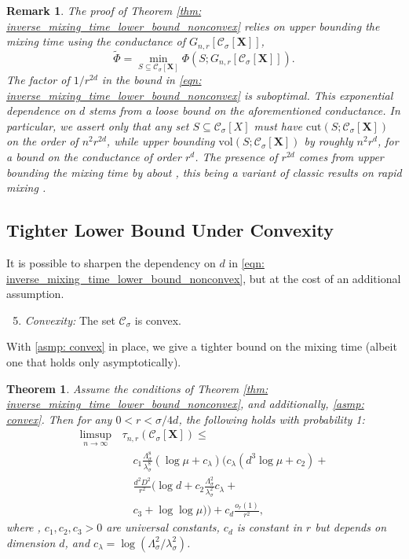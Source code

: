 \documentclass{article}
\newcommand{\vol}{\mathrm{vol}}
\newcommand{\cut}{\mathrm{cut}}
\newcommand{\1}{\mathbf{1}}
\newcommand{\Xbf}{\mathbf{X}}
\newcommand{\Cset}{\mathcal{C}}
\newcommand{\Csig}{\Cset_{\sigma}}
\theoremstyle{aldenthm}
\newtheorem{theorem}{Theorem}
\theoremstyle{aldenrmrk}
\newtheorem{remark}{Remark}
\begin{document}
\begin{remark}
The proof of Theorem \ref{thm: inverse_mixing_time_lower_bound_nonconvex} relies
on upper bounding the mixing time using the \emph{conductance} of $G_{n,r}[\Csig[\Xbf]]$, 
$$
\widetilde{\Phi} = \min_{S \subseteq \Csig[\Xbf]} \Phi(S; G_{n,r}[\Csig[\Xbf]]).
$$
The factor of $1/r^{2d}$ in the bound in \eqref{eqn:
  inverse_mixing_time_lower_bound_nonconvex} is suboptimal. This exponential 
dependence on $d$ stems from a loose bound on the aforementioned
conductance. In particular, we assert only that any set $S \subseteq \Csig[X]$
must have $\cut(S; \Csig[\Xbf])$ on the order of $n^2 r^{2d}$, while upper bounding
$\vol(S; \Csig[\Xbf])$ by roughly $n^2 r^d$, for a bound on the conductance of
order $r^d$. The presence of $r^{2d}$ comes from upper bounding the mixing time
by about , this being a variant of classic results
on rapid mixing \citep{jerrum89}.  
\end{remark}

\subsection{Tighter Lower Bound Under Convexity}

It is possible to sharpen the dependency on $d$ in 
\eqref{eqn: inverse_mixing_time_lower_bound_nonconvex}, but at the cost of an  
additional assumption.
\begin{enumerate}[label=(A\arabic*)]
\setcounter{enumi}{4}
\item 
\label{asmp: convex}
\emph{Convexity:} The set $\Cset_\sigma$ is convex. 
\end{enumerate}

With \ref{asmp: convex} in place, we give a tighter bound on the
mixing time (albeit one that holds only asymptotically).   

\begin{theorem}
\label{thm: inverse_mixing_time_lower_bound}
Assume the conditions of Theorem \ref{thm:
  inverse_mixing_time_lower_bound_nonconvex}, and additionally, \ref{asmp:
  convex}. Then for any $0 < r < \sigma/4d$, the following holds with
probability 1:   
\begin{align}
\label{eqn: inverse_mixing_time_lower_bound}
  \limsup_{n \to \infty} \, &\tau_{n,r}(\Csig[\Xbf]) \leq \nonumber \\ 
&\quad c_1 \frac{\Lambda_{\sigma}^8}{\lambda_{\sigma}^8} (\log \mu +
  c_{\lambda}) \biggl( c_{\lambda}(d^3 \log\mu + c_2) +{} \nonumber \\  
&\quad \frac{d^2D^2}{r^2} \bigl( \log d + c_2
  \frac{\Lambda_{\sigma}^{2}}{\lambda_{\sigma}^{2}}c_{\lambda} +{} \nonumber \\  
&\quad c_3  + \log \log \mu \bigr) \biggr) + c_d \frac{o_r(1)}{r^2},
\end{align}
where , $c_1,c_2,c_3>0$ are universal
constants, $c_d$ is constant in $r$ but depends on dimension $d$, and
$c_{\lambda} = \log(\Lambda_{\sigma}^2/ \lambda_{\sigma}^2)$.  
\end{theorem}
\end{document}
